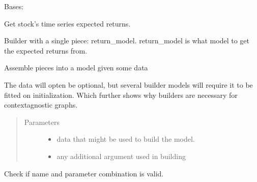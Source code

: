\documentclass[letterpaper,10pt,english]{sphinxmanual}
\begin{document}
\begin{fulllineitems}
\label{\detokenize{dalio.pipe:dalio.pipe.ExpectedReturns}}
Bases: {\hyperref[\detokenize{dalio.pipe:dalio.pipe.pipe.PipeBuilder}]{}}

Get stock’s time series expected returns.

Builder with a single piece: return\_model. return\_model is what model to
get the expected returns from.

\begin{fulllineitems}
\label{\detokenize{dalio.pipe:dalio.pipe.ExpectedReturns.build_model}}
Assemble pieces into a model given some data

The data will opten be optional, but several builder models will
require it to be fitted on initialization. Which further shows why
builders are necessary for context\sphinxhyphen{}agnostic graphs.
\begin{quote}\begin{description}
\item[{Parameters}] \leavevmode\begin{itemize}
\item {} 
 \textendash{} data that might be used to build the model.

\item {} 
 \textendash{} any additional argument used in building

\end{itemize}

\end{description}\end{quote}

\end{fulllineitems}


\begin{fulllineitems}
\label{\detokenize{dalio.pipe:dalio.pipe.ExpectedReturns.check_name}}
Check if name and parameter combination is valid.


\end{fulllineitems}
\end{fulllineitems}
\end{document}
